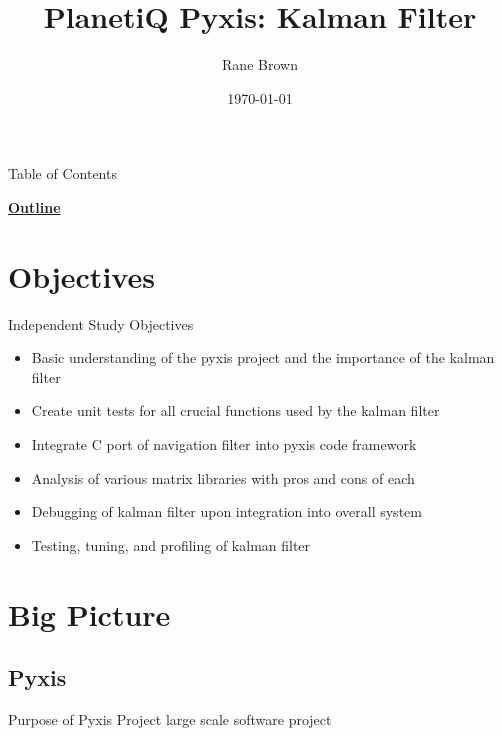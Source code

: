 \documentclass[aspectratio=169,handout]{beamer}
\title{PlanetiQ Pyxis: Kalman Filter}
\institute{University of Colorado Boulder}
\author{Rane Brown}
\date{\today}
\begin{document}
\begin{frame}[t,plain] %
    \titlepage
\end{frame}

\begin{frame}[t]{Table of Contents}
	\begin{center}
		\vspace{-2em}
		{\Large \textbf{\underline{Outline}}}
		\vspace{1em}
	\end{center}
	\begin{multicols}{2}
		\tableofcontents
	\end{multicols}
\end{frame} 

\section{Objectives}%

	\begin{frame}{Independent Study Objectives}
		\begin{itemize}
			\item Basic understanding of the pyxis project and the importance of the kalman filter
			\item Create unit tests for all crucial functions used by the kalman filter
			\item Integrate C port of navigation filter into pyxis code framework
			\item Analysis of various matrix libraries with pros and cons of each
			\item Debugging of kalman filter upon integration into overall system
			\item Testing, tuning, and profiling of kalman filter
		\end{itemize}
	\end{frame}

\section{Big Picture}%

\subsection{Pyxis}
	\begin{frame}{Purpose of Pyxis Project}
	large scale software project
	\end{frame}
\end{document}
